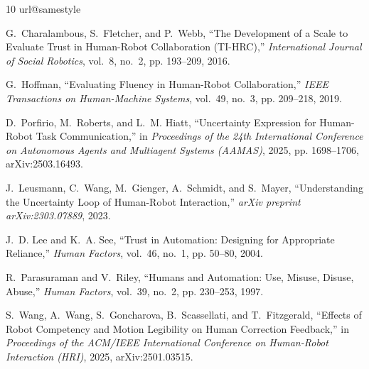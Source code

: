 \documentclass[conference]{IEEEtran}
\begin{document}
\begin{thebibliography}{10}
\providecommand{\url}[1]{#1}
\csname url@samestyle\endcsname
\providecommand{\newblock}{\relax}
\providecommand{\bibinfo}[2]{#2}
\providecommand{\BIBentrySTDinterwordspacing}{\spaceskip=0pt\relax}
\providecommand{\BIBentryALTinterwordstretchfactor}{4}
\providecommand{\BIBentryALTinterwordspacing}{\spaceskip=\fontdimen2\font plus
\BIBentryALTinterwordstretchfactor\fontdimen3\font minus
  \fontdimen4\font\relax}
\providecommand{\BIBforeignlanguage}[2]{{%
\expandafter\ifx\csname l@#1\endcsname\relax
\typeout{** WARNING: IEEEtran.bst: No hyphenation pattern has been}%
\typeout{** loaded for the language `#1'. Using the pattern for}%
\typeout{** the default language instead.}%
\else
\language=\csname l@#1\endcsname
\fi
#2}}
\providecommand{\BIBdecl}{\relax}
\BIBdecl

G.~Charalambous, S.~Fletcher, and P.~Webb, ``{The Development of a Scale to
  Evaluate Trust in Human-Robot Collaboration (TI-HRC)},'' \emph{International
  Journal of Social Robotics}, vol.~8, no.~2, pp. 193--209, 2016.

G.~Hoffman, ``{Evaluating Fluency in Human-Robot Collaboration},'' \emph{IEEE
  Transactions on Human-Machine Systems}, vol.~49, no.~3, pp. 209--218, 2019.

D.~Porfirio, M.~Roberts, and L.~M. Hiatt, ``{Uncertainty Expression for
  Human-Robot Task Communication},'' in \emph{Proceedings of the 24th
  International Conference on Autonomous Agents and Multiagent Systems
  (AAMAS)}, 2025, pp. 1698--1706, arXiv:2503.16493.

J.~Leusmann, C.~Wang, M.~Gienger, A.~Schmidt, and S.~Mayer, ``Understanding the Uncertainty Loop of Human-Robot Interaction,'' \emph{arXiv preprint arXiv:2303.07889}, 2023.

J.~D. Lee and K.~A. See, ``{Trust in Automation: Designing for Appropriate
  Reliance},'' \emph{Human Factors}, vol.~46, no.~1, pp. 50--80, 2004.

R.~Parasuraman and V.~Riley, ``{Humans and Automation: Use, Misuse, Disuse,
  Abuse},'' \emph{Human Factors}, vol.~39, no.~2, pp. 230--253, 1997.

S.~Wang, A.~Wang, S.~Goncharova, B.~Scassellati, and T.~Fitzgerald, ``Effects of Robot Competency and Motion Legibility on Human Correction Feedback,'' in \emph{Proceedings of the ACM/IEEE International Conference on Human-Robot Interaction (HRI)}, 2025, arXiv:2501.03515.


\end{thebibliography}
\end{document}
